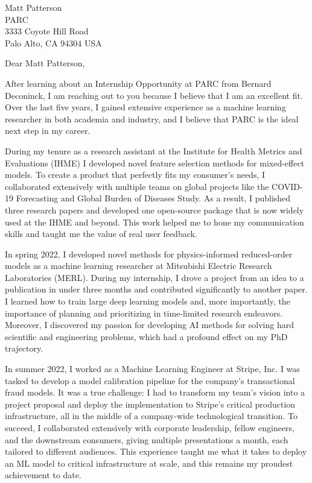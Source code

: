   \begin{letter}{%
  	Matt Patterson \\
    PARC \\
    3333 Coyote Hill Road \\
	Palo Alto, CA 94304 USA
    }
    
  
    
    \opening{Dear Matt Patterson,} %
    
    
    After learning about an Internship Opportunity at PARC from Bernard Deconinck, I am reaching out to you because I believe that I am an excellent fit. Over the last five years, I gained extensive experience as a machine learning researcher in both academia and industry, and I believe that PARC is the ideal next step in my career. 

During my tenure as a research assistant at the Institute for Health Metrics and Evaluations (IHME) I developed novel feature selection methods for mixed-effect models. To create a product that perfectly fits my consumer's needs, I collaborated extensively with multiple teams on global projects like the COVID-19 Forecasting and Global Burden of Diseases Study. As a result, I published three research papers and developed one open-source package that is now widely used at the IHME and beyond. This work helped me to hone my communication skills and taught me the value of real user feedback.

In spring 2022, I developed novel methods for physics-informed reduced-order models as a machine learning researcher at Mitsubishi Electric Research Laboratories (MERL). During my internship, I drove a project from an idea to a publication in under three months and contributed significantly to another paper. I learned how to train large deep learning models and, more importantly, the importance of planning and prioritizing in time-limited research endeavors. Moreover, I discovered my passion for developing AI methods for solving hard scientific and engineering problems, which had a  profound effect on my PhD trajectory.

In summer 2022, I worked as a Machine Learning Engineer at Stripe, Inc. I was tasked to develop a model calibration pipeline for the company's transactional fraud models. It was a true challenge: I had to transform my team's vision into a project proposal and deploy the implementation to Stripe's critical production infrastructure, all in the middle of a company-wide technological transition. To succeed, I collaborated extensively with corporate leadership, fellow engineers, and the downstream consumers, giving multiple presentations a month, each tailored to different audiences. This experience taught me what it takes to deploy an ML model to critical infrastructure at scale, and this remains my proudest achievement to date. 


\end{letter}
